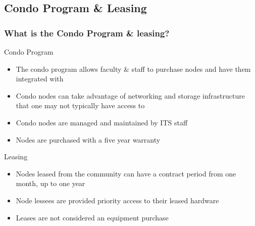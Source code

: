 \subsection{Condo Program \& Leasing}
\begin{frame}
  \frametitle{What is the Condo Program \& leasing?}
	\begin{block}{Condo Program}\scriptsize
		\begin{itemize}
		\item The condo program allows faculty \& staff to purchase nodes and have them integrated with {\mana}
		\item Condo nodes can take advantage of networking and storage infrastructure that one may not typically have access to
		\item Condo nodes are managed and maintained by ITS staff
		\item Nodes are purchased with a five year warranty
		\end{itemize}
	\end{block}
	\begin{block}{Leasing}\scriptsize
		\begin{itemize}
		\item Nodes leased from the community can have a contract period from one month, up to one year
		\item Node lessees are provided priority access to their leased hardware
		\item Leases are not considered an equipment purchase
		\end{itemize}
	\end{block}
\end{frame}


